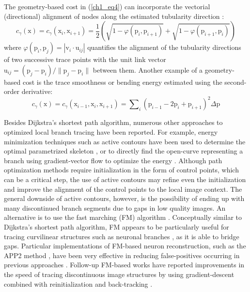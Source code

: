 The geometry-based cost in (\ref{ch1_eq4}) can incorporate the vectorial (directional) alignment of nodes along the estimated tubularity direction \cite{meijering2004design}:
\begin{equation}
c_{\gamma}(\mathrm{x}) = c_{\gamma}(\mathrm{x}_{i}, \mathrm{x}_{i+1}) = \frac{1}{2} \left( \sqrt{1 - \varphi(\mathrm{p}_i, \mathrm{p}_{i+1})} + \sqrt{1 - \varphi(\mathrm{p}_{i+1}, \mathrm{p}_{i})} \right) 
\end{equation}
where $\varphi( \mathrm{p}_{i}, \mathrm{p}_{j} ) = | \mathrm{v}_i \cdot \mathrm{u}_{ij} | $ quantifies the alignment of the tubularity directions of two successive trace points with the unit link vector $\mathrm{u}_{ij} = (\mathrm{p}_j - \mathrm{p}_i) / \lVert \mathrm{p}_j - \mathrm{p}_i \rVert $ between them. Another example of a geometry-based cost is the trace smoothness \cite{peng2010automatic} or bending energy \cite{radojevic2016fuzzy} estimated using the second-order derivative:
\begin{equation}
c_{\gamma}(\mathrm{x}) = c_{\gamma}(\mathrm{x}_{i-1}, \mathrm{x}_{i}, \mathrm{x}_{i+1}) = \sum\nolimits_{i} (\mathrm{p}_{i-1} - 2\mathrm{p}_i + \mathrm{p}_{i+1})^2 \Delta\mathrm{p}
\end{equation}

Besides Dijkstra's shortest path algorithm, numerous other approaches to optimized local branch tracing have been reported. For example, energy minimization techniques such as active contours have been used to determine the optimal parametrized skeleton \cite{schmitt2004new}, or to directly find the open-curve representing a branch using gradient-vector flow to optimize the energy \cite{wang2011broadly}. Although path optimization methods require initialization in the form of control points, which can be a critical step, the use of active contours may refine even the initialization and improve the alignment of the control points to the local image context. The general downside of active contours, however, is the possibility of ending up with many discontinued branch segments due to gaps in low quality images. An alternative is to use the fast marching (FM) algorithm \cite{sethian1999level}. Conceptually similar to Dijkstra's shortest path algorithm, FM appears to be particularly useful for tracing curvilinear structures such as neuronal branches \cite{xiao2013app2, peng2011automatic, mukherjee2012automated, van2007subvoxel, santamaria2015automatic, basu2014reconstructing}, as it is able to bridge gaps. Particular implementations of FM-based neuron reconstruction, such as the APP2 method \cite{xiao2013app2}, have been very effective in reducing false-positives occurring in previous approaches \cite{van2007subvoxel, peng2011automatic}. Follow-up FM-based works have reported improvements in the speed of tracing discontinuous image structures by using gradient-descent combined with reinitialization \cite{mukherjee2012automated} and back-tracking \cite{liu2016rivulet}.

